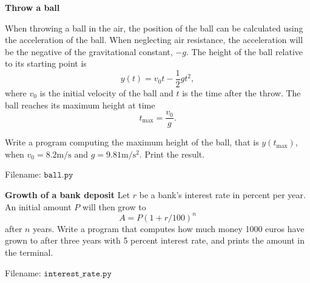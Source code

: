 
\begin{Problem}{\textbf{Throw a ball}} \label{prob11}

\noindent When throwing a ball in the air, the position of the ball can be calculated using the acceleration of the ball.  When neglecting air resistance, the acceleration will be the negative of the gravitational constant, $-g$. The height of the ball relative to its starting
point is
\begin{equation*}
y(t) = v_0t - \frac{1}{2}gt^2,
\end{equation*}
where $v_0$ is the initial velocity of the ball and $t$ is the time after the throw.
The ball reaches its maximum height at time
\begin{equation*}
t_{\text{max}} = \frac{v_0}{g}.
\end{equation*}

Write a program computing the maximum height of the ball, that is $y(t_{\text{max}})$,
when $v_0 = 8.2\mathrm{m/s}$ and $g = 9.81\mathrm{m/s^2}$. Print the result.

Filename: $\texttt{ball.py}$
\end{Problem}

\begin{Problem}{\textbf{Growth of a bank deposit}}\label{prob12}
Let $r$ be a bank’s interest rate in percent per year. An initial amount $P$ will then grow to
$$
A = P(1+r/100)^n
$$
after $n$ years. Write a  program that computes how much money 1000 euros have
grown to after three years with 5 percent interest rate, and prints the amount in the terminal.

Filename: $\texttt{interest\_rate.py}$
\end{Problem}

